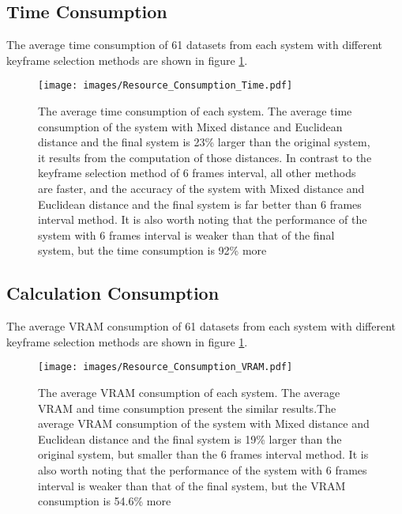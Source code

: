\subsection{Time Consumption}
The average time consumption of 61 datasets from each system with different keyframe selection methods are shown in figure \ref{Resource_Consumption_Time}.
\begin{figure}[thb]
    \centering
    \texttt{[image: images/Resource\_Consumption\_Time.pdf]}
    \caption[The average time consumption of each system]{The average time consumption of each system. The average time consumption of the system with Mixed distance and Euclidean distance and the final system is 23\% larger than the original system, it results from the computation of those distances. In contrast to the keyframe selection method of 6 frames interval, all other methods are faster, and the accuracy of the system with Mixed distance and Euclidean distance and the final system is far better than 6 frames interval method. It is also worth noting that the performance of the system with 6 frames interval is weaker than that of the final system, but the time consumption is 92\% more}\label{Resource_Consumption_Time}
\end{figure}

\subsection{Calculation Consumption}
The average \ac{VRAM} consumption of 61 datasets from each system with different keyframe selection methods are shown in figure \ref{Resource_Consumption_Time}.
\begin{figure}[thb]
    \centering
    \texttt{[image: images/Resource\_Consumption\_VRAM.pdf]}
    \caption[The average VRAM consumption of each system]{The average VRAM consumption of each system. The average VRAM and time consumption present the similar results.The average VRAM consumption of the system with Mixed distance and Euclidean distance and the final system is 19\% larger than the original system, but smaller than the 6 frames interval method. It is also worth noting that the performance of the system with 6 frames interval is weaker than that of the final system, but the VRAM consumption is 54.6\% more}\label{Resource_Consumption_VRAM}
\end{figure}